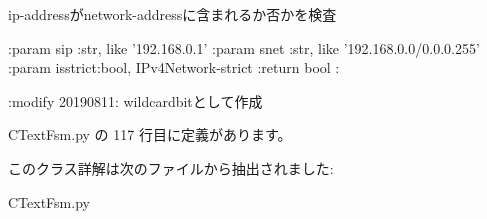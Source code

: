 \begin{DoxyVerb}ip-addressがnetwork-addressに含まれるか否かを検査

:param  sip  :str, like '192.168.0.1'
:param  snet :str, like '192.168.0.0/0.0.0.255'
:param  isstrict:bool, IPv4Network-strict
:return bool :

:modify 20190811:
  wildcardbitとして作成
\end{DoxyVerb}
 

 C\+Text\+Fsm.\+py の 117 行目に定義があります。



このクラス詳解は次のファイルから抽出されました\+:\begin{DoxyCompactItemize}
\item 
C\+Text\+Fsm.\+py\end{DoxyCompactItemize}
